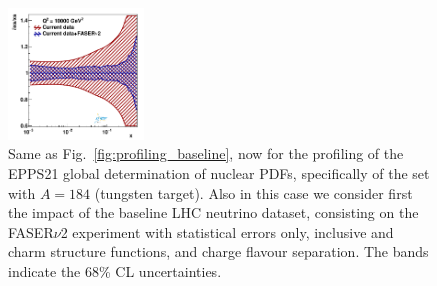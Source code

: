 \begin{figure}[t]
\includegraphics[width=0.32\textwidth]{plots/nuclear_fasernu2/inclusive+charm_chargediscrimination/statOnly_FASERv2_q2_10000_pdf_s_ratio.pdf}
\caption{Same as Fig.~\ref{fig:profiling_baseline},
now for the profiling of the EPPS21 global determination of nuclear PDFs,
specifically of the set with $A=184$ (tungsten target).
%
Also in this case we consider first the impact of the baseline LHC neutrino dataset, consisting
on the FASER$\nu$2 experiment
with statistical errors only, inclusive and charm structure functions,  and charge flavour
separation.
%
The bands indicate the 68\% CL uncertainties.
}
\label{fig:profiling_baseline_nuclear}
\end{figure}
